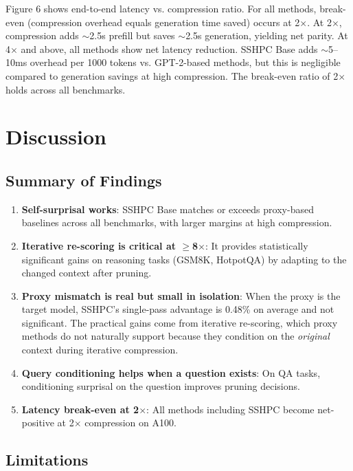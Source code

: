 \documentclass[11pt,letterpaper]{article}
\begin{document}
Figure 6 shows end-to-end latency vs. compression ratio. For all methods, break-even (compression overhead equals generation time saved) occurs at 2$\times$. At 2$\times$, compression adds $\sim$2.5s prefill but saves $\sim$2.5s generation, yielding net parity. At 4$\times$ and above, all methods show net latency reduction. SSHPC Base adds $\sim$5--10ms overhead per 1000 tokens vs. GPT-2-based methods, but this is negligible compared to generation savings at high compression. The break-even ratio of 2$\times$ holds across all benchmarks.

\section{Discussion}

\subsection{Summary of Findings}

\begin{enumerate}
  \item \textbf{Self-surprisal works}: SSHPC Base matches or exceeds proxy-based baselines across all benchmarks, with larger margins at high compression.
  \item \textbf{Iterative re-scoring is critical at $\ge$8$\times$}: It provides statistically significant gains on reasoning tasks (GSM8K, HotpotQA) by adapting to the changed context after pruning.
  \item \textbf{Proxy mismatch is real but small in isolation}: When the proxy is the target model, SSHPC's single-pass advantage is 0.48\% on average and not significant. The practical gains come from iterative re-scoring, which proxy methods do not naturally support because they condition on the \textit{original} context during iterative compression.
  \item \textbf{Query conditioning helps when a question exists}: On QA tasks, conditioning surprisal on the question improves pruning decisions.
  \item \textbf{Latency break-even at 2$\times$}: All methods including SSHPC become net-positive at 2$\times$ compression on A100.
\end{enumerate}

\subsection{Limitations}
\end{document}
